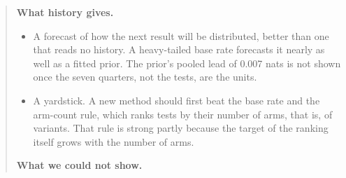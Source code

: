 \documentclass[sigconf,nonacm]{acmart}
\begin{document}
\begin{abstract}
\textbf{What history gives.}
\setlength{\leftmargini}{1em}
\begin{itemize}
\item A forecast of how the next result will be distributed, better than one that reads no history. A heavy-tailed base rate forecasts it nearly as well as a fitted prior. The prior's pooled lead of 0.007 nats is not shown once the seven quarters, not the tests, are the units.
\item A yardstick. A new method should first beat the base rate and the arm-count rule, which ranks tests by their number of arms, that is, of variants. That rule is strong partly because the target of the ranking itself grows with the number of arms.
\end{itemize}
\textbf{What we could not show.}
\begin{itemize}

\end{itemize}
\end{abstract}
\end{document}
